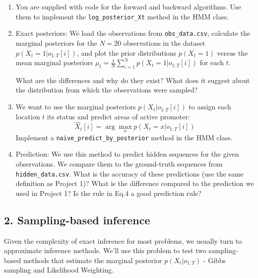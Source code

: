 \documentclass{article}
\begin{document}
\begin{enumerate}
    \item You are supplied with code for the forward and backward algorithms. Use them to implement the \texttt{log\_posterior\_Xt} method in the HMM class.
    
    \item Exact posteriors:
    We load the observations from \texttt{obs\_data.csv}, calculate the marginal posteriors for the $N = 20$ observations in the dataset $p(X_t = 1 | o_{1:T}[i])$, and plot the prior distributions $p(X_t = 1)$ versus the mean marginal posteriors $\mu_t = \frac{1}{N} \sum_{i=1}^{N} p(X_t = 1 | o_{1:T}[i])$ for each $t$.
    
    What are the differences and why do they exist? What does it suggest about the distribution from which the observations were sampled?
    
    \item We want to use the marginal posteriors $p(X_t | o_{1:T}[i])$ to assign each location $t$ its status and predict areas of active promoter:
    \[
    \hat{X}_t[i] = \arg\max_x p(X_t = x | o_{1:T}[i])
    \]
    Implement a \texttt{naive\_predict\_by\_posterior} method in the HMM class.
    
    \item Prediction:
    We use this method to predict hidden sequences for the given observations. We compare them to the ground-truth sequences from \texttt{hidden\_data.csv}. What is the accuracy of these predictions (use the same definition as Project 1)? What is the difference compared to the prediction we used in Project 1? Is the rule in Eq.4 a good prediction rule?
\end{enumerate}

\subsection*{2. Sampling-based inference}

Given the complexity of exact inference for most problems, we usually turn to approximate inference methods. We’ll use this problem to test two sampling-based methods that estimate the marginal posterior $p(X_t | o_{1:T})$ - Gibbs sampling and Likelihood Weighting.
\end{document}
